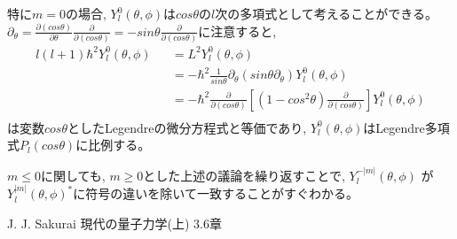 \documentclass[11pt,a4paper]{jsarticle}
\begin{document}
特に$m=0$の場合, $Y_l^0 (\theta,\phi)$は$cos \theta$の$l$次の多項式として考えることができる。
$\partial_\theta= \frac{\partial( cos \theta)}{\partial \theta} \frac{\partial}{\partial( cos \theta)}= -sin\theta\frac{\partial}{\partial( cos \theta)}$に注意すると, 
\begin{eqnarray}
 l(l+1)\hbar^2 Y_l^0 (\theta,\phi)  &&= L^2 Y_l^0 (\theta,\phi) \nonumber \\
 &&= -\hbar^2 \frac{1}{sin\theta }\partial_\theta  ( sin\theta  \partial_\theta)Y_l^0 (\theta,\phi) \nonumber \\
 &&= - \hbar^2 \frac{\partial}{\partial( cos \theta)} [ ( 1- cos^2\theta) \frac{\partial}{\partial( cos \theta)} ] Y_l^0 (\theta,\phi) \nonumber \\
\end{eqnarray}
は変数$cos \theta$としたLegendreの微分方程式と等価であり, $Y_l^0 (\theta,\phi)$はLegendre多項式$P_l(cos\theta)$に比例する。

$m\le0$に関しても, $m\ge0$とした上述の議論を繰り返すことで,  $Y_l^{-|m|} (\theta,\phi)$ が $Y_l^{|m|}(\theta,\phi)^*$に符号の違いを除いて一致することがすぐわかる。

\begin{thebibliography}{9}
 J. J. Sakurai 現代の量子力学(上) 3.6章
\end{thebibliography}
\end{document}
